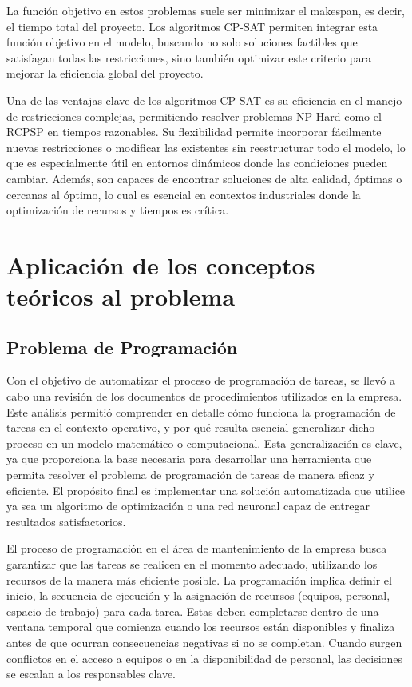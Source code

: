 \documentclass{article}
\begin{document}
La función objetivo en estos problemas suele ser minimizar el makespan, es decir, el tiempo total del proyecto. Los algoritmos CP-SAT permiten integrar esta función objetivo en el modelo, buscando no solo soluciones factibles que satisfagan todas las restricciones, sino también optimizar este criterio para mejorar la eficiencia global del proyecto.

Una de las ventajas clave de los algoritmos CP-SAT es su eficiencia en el manejo de restricciones complejas, permitiendo resolver problemas NP-Hard como el RCPSP en tiempos razonables. Su flexibilidad permite incorporar fácilmente nuevas restricciones o modificar las existentes sin reestructurar todo el modelo, lo que es especialmente útil en entornos dinámicos donde las condiciones pueden cambiar. Además, son capaces de encontrar soluciones de alta calidad, óptimas o cercanas al óptimo, lo cual es esencial en contextos industriales donde la optimización de recursos y tiempos es crítica.


\section{Aplicación de los conceptos teóricos al problema}

\subsection{Problema de Programación}
Con el objetivo de automatizar el proceso de programación de tareas, se llevó a cabo una revisión de los documentos de procedimientos utilizados en la empresa. Este análisis permitió comprender en detalle cómo funciona la programación de tareas en el contexto operativo, y por qué resulta esencial generalizar dicho proceso en un modelo matemático o computacional. Esta generalización es clave, ya que proporciona la base necesaria para desarrollar una herramienta que permita resolver el problema de programación de tareas de manera eficaz y eficiente. El propósito final es implementar una solución automatizada que utilice ya sea un algoritmo de optimización o una red neuronal capaz de entregar resultados satisfactorios.

El proceso de programación en el área de mantenimiento de la empresa busca garantizar que las tareas se realicen en el momento adecuado, utilizando los recursos de la manera más eficiente posible. La programación implica definir el inicio, la secuencia de ejecución y la asignación de recursos (equipos, personal, espacio de trabajo) para cada tarea. Estas deben completarse dentro de una ventana temporal que comienza cuando los recursos están disponibles y finaliza antes de que ocurran consecuencias negativas si no se completan. Cuando surgen conflictos en el acceso a equipos o en la disponibilidad de personal, las decisiones se escalan a los responsables clave.
\end{document}
